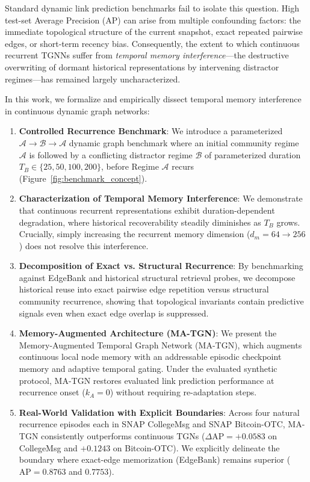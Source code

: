Standard dynamic link prediction benchmarks \citep{poursafaei2022towards, kazemi2020representation} fail to isolate this question. High test-set Average Precision (AP) can arise from multiple confounding factors: the immediate topological structure of the current snapshot, exact repeated pairwise edges, or short-term recency bias. Consequently, the extent to which continuous recurrent TGNNs suffer from \textit{temporal memory interference}---the destructive overwriting of dormant historical representations by intervening distractor regimes---has remained largely uncharacterized.

In this work, we formalize and empirically dissect temporal memory interference in continuous dynamic graph networks:
\begin{enumerate}
    \item \textbf{Controlled Recurrence Benchmark}: We introduce a parameterized $\mathcal{A} \to \mathcal{B} \to \mathcal{A}$ dynamic graph benchmark where an initial community regime $\mathcal{A}$ is followed by a conflicting distractor regime $\mathcal{B}$ of parameterized duration $T_B \in \{25, 50, 100, 200\}$, before Regime $\mathcal{A}$ recurs (Figure~\ref{fig:benchmark_concept}).
    \item \textbf{Characterization of Temporal Memory Interference}: We demonstrate that continuous recurrent representations exhibit duration-dependent degradation, where historical recoverability steadily diminishes as $T_B$ grows. Crucially, simply increasing the recurrent memory dimension ($d_m = 64 \to 256$) does not resolve this interference.
    \item \textbf{Decomposition of Exact vs. Structural Recurrence}: By benchmarking against EdgeBank \citep{poursafaei2022towards} and historical structural retrieval probes, we decompose historical reuse into exact pairwise edge repetition versus structural community recurrence, showing that topological invariants contain predictive signals even when exact edge overlap is suppressed.
    \item \textbf{Memory-Augmented Architecture (MA-TGN)}: We present the Memory-Augmented Temporal Graph Network (MA-TGN), which augments continuous local node memory with an addressable episodic checkpoint memory and adaptive temporal gating. Under the evaluated synthetic protocol, MA-TGN restores evaluated link prediction performance at recurrence onset ($k_A=0$) without requiring re-adaptation steps.
    \item \textbf{Real-World Validation with Explicit Boundaries}: Across four natural recurrence episodes each in SNAP CollegeMsg and SNAP Bitcoin-OTC, MA-TGN consistently outperforms continuous TGNs ($\Delta\text{AP} = +0.0583$ on CollegeMsg and $+0.1243$ on Bitcoin-OTC). We explicitly delineate the boundary where exact-edge memorization (EdgeBank) remains superior ($\text{AP} = 0.8763$ and $0.7753$).
\end{enumerate}
